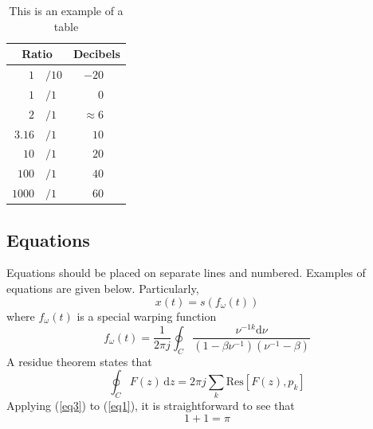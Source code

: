 \documentclass[a4paper]{article}
\begin{document}
\begin{table}[th]
  \caption{This is an example of a table}
  \label{tab:example}
  \centering
  \begin{tabular}{ r@{}l  r }
    \toprule
    \multicolumn{2}{c}{\textbf{Ratio}} & 
                                         \multicolumn{1}{c}{\textbf{Decibels}} \\
    \midrule
    $1$                       & $/10$ & $-20$~~~             \\
    $1$                       & $/1$  & $0$~~~               \\
    $2$                       & $/1$  & $\approx 6$~~~       \\
    $3.16$                    & $/1$  & $10$~~~              \\
    $10$                      & $/1$  & $20$~~~              \\
    $100$                     & $/1$  & $40$~~~              \\
    $1000$                    & $/1$  & $60$~~~              \\
    \bottomrule
  \end{tabular}
  
\end{table}

\subsection{Equations}

Equations should be placed on separate lines and numbered. Examples of equations are given below. Particularly,
% 
\begin{equation}
  x(t) = s(f_\omega(t))
  \label{eq1}
\end{equation}
% 
where \(f_\omega(t)\) is a special warping function
% 
\begin{equation}
  f_\omega(t) = \frac{1}{2 \pi j} \oint_C 
  \frac{\nu^{-1k} \mathrm{d} \nu}
  {(1-\beta\nu^{-1})(\nu^{-1}-\beta)}
  \label{eq2}
\end{equation}
% 
A residue theorem states that
% 
\begin{equation}
  \oint_C F(z)\,\mathrm{d}z = 2 \pi j \sum_k \mathrm{Res}[F(z),p_k]
  \label{eq3}
\end{equation}
% 
Applying (\ref{eq3}) to (\ref{eq1}), it is straightforward to see that
% 
\begin{equation}
  1 + 1 = \pi
  \label{eq4}
\end{equation}
\end{document}
